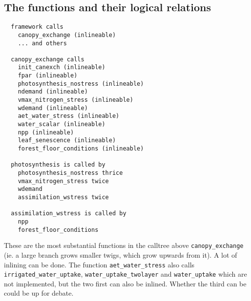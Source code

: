 \subsection{The functions and their logical relations}
\begin{verbatim}
  framework calls
    canopy_exchange (inlineable)
    ... and others

  canopy_exchange calls
    init_canexch (inlineable)
    fpar (inlineable)
    photosynthesis_nostress (inlineable)
    ndemand (inlineable)
    vmax_nitrogen_stress (inlineable)
    wdemand (inlineable)
    aet_water_stress (inlineable)
    water_scalar (inlineable)
    npp (inlineable)
    leaf_senescence (inlineable)
    forest_floor_conditions (inlineable)

  photosynthesis is called by
    photosynthesis_nostress thrice
    vmax_nitrogen_stress twice
    wdemand
    assimilation_wstress twice

  assimilation_wstress is called by
    npp
    forest_floor_conditions
\end{verbatim}
These are the most substantial functions in the calltree above \texttt{canopy_exchange} (ie. a large branch grows smaller twigs, which grow upwards from it). A lot of inlining can be done. The function \texttt{aet_water_stress} also calls \texttt{irrigated_water_uptake}, \texttt{water_uptake_twolayer} and \texttt{water_uptake} which are not implemented, but the two first can also be inlined. Whether the third can be could be up for debate.
